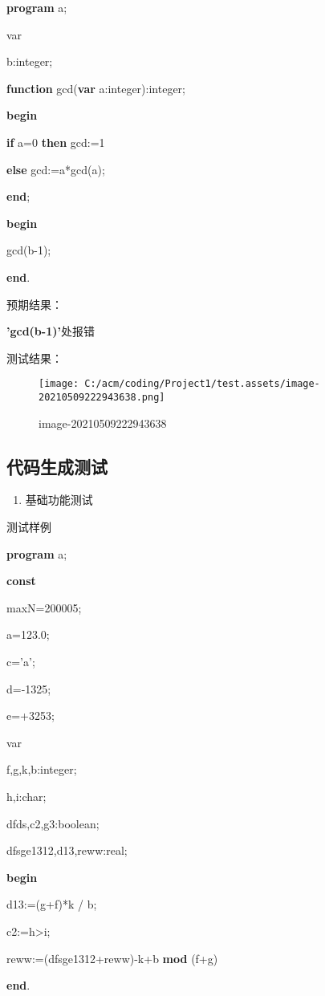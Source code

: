\documentclass[]{ctexart}
\newenvironment{Shaded}{}{}
\newcommand{\DataTypeTok}[1]{\textcolor[rgb]{0.56,0.13,0.00}{#1}}
\newcommand{\DecValTok}[1]{\textcolor[rgb]{0.25,0.63,0.44}{#1}}
\newcommand{\KeywordTok}[1]{\textcolor[rgb]{0.00,0.44,0.13}{\textbf{#1}}}
\newcommand{\NormalTok}[1]{#1}
\newcommand{\StringTok}[1]{\textcolor[rgb]{0.25,0.44,0.63}{#1}}
\begin{document}
\begin{Shaded}
\begin{Highlighting}[]


\KeywordTok{program}\NormalTok{ a;
}
\NormalTok{var
}
\NormalTok{    b:}\DataTypeTok{integer}\NormalTok{;
}
\KeywordTok{function}\NormalTok{ gcd(}\KeywordTok{var}\NormalTok{ a:}\DataTypeTok{integer}\NormalTok{):}\DataTypeTok{integer}\NormalTok{;
}
\KeywordTok{begin}

    \KeywordTok{if}\NormalTok{ a=}\DecValTok{0} \KeywordTok{then}\NormalTok{ gcd:=}\DecValTok{1}

    \KeywordTok{else}\NormalTok{ gcd:=a*gcd(a);
}
\KeywordTok{end}\NormalTok{;
}
\KeywordTok{begin}

\NormalTok{    gcd(b}\DecValTok{-1}\NormalTok{);
}
\KeywordTok{end}\NormalTok{.
}
\end{Highlighting}
\end{Shaded}

预期结果：

\textbf{'gcd(b-1)'}处报错

测试结果：

\begin{figure}
\centering
\texttt{[image: C:/acm/coding/Project1/test.assets/image-20210509222943638.png]}
\caption{image-20210509222943638}
\end{figure}

\hypertarget{header-n399}{%
\subsection{代码生成测试}\label{header-n399}}

\begin{enumerate}
\def\labelenumi{\arabic{enumi}.}
\item
  基础功能测试
\end{enumerate}

测试样例

\begin{Shaded}
\begin{Highlighting}[]
\KeywordTok{program}\NormalTok{ a;
}
\KeywordTok{const} 

\NormalTok{    maxN=}\DecValTok{200005}\NormalTok{;
}
\NormalTok{    a=}\DecValTok{123.0}\NormalTok{;
}
\NormalTok{    c=}\StringTok{'a'}\NormalTok{;
}
\NormalTok{    d=-}\DecValTok{1325}\NormalTok{;
}
\NormalTok{    e=+}\DecValTok{3253}\NormalTok{;
}
\NormalTok{var
}
\NormalTok{    f,g,k,b:}\DataTypeTok{integer}\NormalTok{;
}
\NormalTok{      h,i:}\DataTypeTok{char}\NormalTok{;
}
\NormalTok{    dfds,c2,g3:}\DataTypeTok{boolean}\NormalTok{;
}
\NormalTok{    dfsge1312,d13,reww:}\DataTypeTok{real}\NormalTok{;
}
 \KeywordTok{begin}

\NormalTok{    d13:=(g+f)*k / b;
}
\NormalTok{	c2:=h>i;
}
\NormalTok{	reww:=(dfsge1312+reww)-k+b }\KeywordTok{mod}\NormalTok{ (f+g)
}
    

 \KeywordTok{end}\NormalTok{.}
\end{Highlighting}
\end{Shaded}
\end{document}
